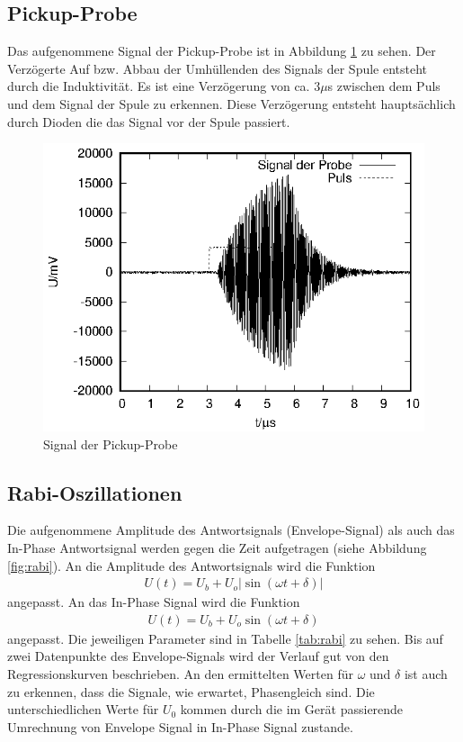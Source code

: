 \subsection{Pickup-Probe}
Das aufgenommene Signal der Pickup-Probe ist in Abbildung \ref{fig:pickup} zu sehen. Der Verzögerte Auf bzw. Abbau der Umhüllenden des Signals der Spule entsteht durch die Induktivität. Es ist eine Verzögerung von ca. $3\mu$s zwischen dem Puls und dem Signal der Spule zu erkennen. Diese Verzögerung entsteht hauptsächlich durch Dioden die das Signal vor der Spule passiert.

\begin{figure}[h]
  \centering
  \includegraphics[width=0.75 \linewidth]{data/p402_443_data/pickup_probe/pickup.eps}
  \caption{Signal der Pickup-Probe}
  \label{fig:pickup}
\end{figure}

\subsection{Rabi-Oszillationen}
Die aufgenommene Amplitude des Antwortsignals (Envelope-Signal) als auch das In-Phase Antwortsignal werden gegen die Zeit aufgetragen (siehe Abbildung \ref{fig:rabi}). An die Amplitude des Antwortsignals wird die Funktion
\begin{align*}
  U(t)=U_b+U_o|\sin(\omega t+\delta)|
\end{align*}
angepasst. An das In-Phase Signal wird die Funktion
\begin{align*}
  U(t)=U_b+U_o\sin(\omega t+\delta)
\end{align*}
angepasst. Die jeweiligen Parameter sind in Tabelle \ref{tab:rabi} zu sehen. Bis auf zwei Datenpunkte des Envelope-Signals wird der Verlauf gut von den Regressionskurven beschrieben. An den ermittelten Werten für $\omega$ und $\delta$ ist auch zu erkennen, dass die Signale, wie erwartet, Phasengleich sind. Die unterschiedlichen Werte für $U_0$ kommen durch die im Gerät passierende Umrechnung von Envelope Signal in In-Phase Signal zustande.

